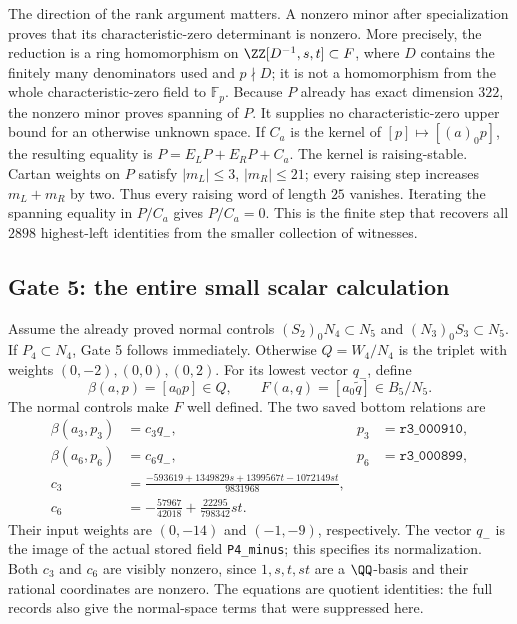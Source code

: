 The direction of the rank argument matters.  A nonzero minor after
specialization proves that its characteristic-zero determinant is
nonzero.  More precisely, the reduction is a ring homomorphism on
$\ZZ[D^{-1},s,t]\subset F$, where $D$ contains the finitely many
denominators used and $p\nmid D$; it is not a homomorphism from the
whole characteristic-zero field to $\mathbb F_p$.  Because $P$
already has exact dimension $322$, the nonzero minor proves
spanning of $P$.  It supplies no characteristic-zero upper bound
for an otherwise unknown space.  If $C_a$ is the kernel of
$[p]\mapsto[(a)_0p]$, the resulting equality is
$P=E_LP+E_RP+C_a$.  The kernel is raising-stable.  Cartan weights
on $P$ satisfy $|m_L|\leq3$, $|m_R|\leq21$; every raising step
increases $m_L+m_R$ by two.  Thus every raising word of length
$25$ vanishes.  Iterating the spanning equality in $P/C_a$ gives
$P/C_a=0$.  This is the finite step that recovers all $2898$
highest-left identities from the smaller collection of witnesses.

\subsection{Gate 5: the entire small scalar calculation}

Assume the already proved normal controls
$(S_2)_0N_4\subset N_5$ and $(N_3)_0S_3\subset N_5$.
If $P_4\subset N_4$, Gate 5 follows immediately.  Otherwise
$Q=W_4/N_4$ is the triplet with weights $(0,-2),(0,0),(0,2)$.
For its lowest vector $q_-$, define
\[
 \beta(a,p)=[a_0p]\in Q,\qquad
 F(a,q)=[a_0\widetilde q]\in B_5/N_5.
\]
The normal controls make $F$ well defined.  The two saved bottom
relations are
\begin{align*}
 \beta(a_3,p_3)&=c_3q_-,& p_3&=\texttt{r3\_000910},\\
 \beta(a_6,p_6)&=c_6q_-,& p_6&=\texttt{r3\_000899},\\
 c_3&=\frac{-593619+1349829s+1399567t-1072149st}{9831968},\\
 c_6&=-\frac{57967}{42018}+\frac{22295}{798342}st.
\end{align*}
Their input weights are $(0,-14)$ and $(-1,-9)$, respectively.
The vector $q_-$ is the image of the actual stored field
\texttt{P4\_minus}; this specifies its normalization.  Both
$c_3$ and $c_6$ are visibly nonzero, since $1,s,t,st$ are a
$\QQ$-basis and their rational coordinates are nonzero.
The equations are quotient identities: the full records also
give the normal-space terms that were suppressed here.

